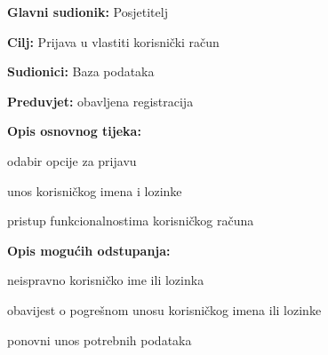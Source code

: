 					\noindent {}
					\begin{packed_item}
	
						\item \textbf{Glavni sudionik: }Posjetitelj
						\item  \textbf{Cilj:} Prijava u vlastiti korisnički račun
						\item  \textbf{Sudionici:} Baza podataka
						\item  \textbf{Preduvjet:} obavljena registracija
						\item  \textbf{Opis osnovnog tijeka:}
						
						\item[] \begin{packed_enum}
	
							\item odabir opcije za prijavu 
							\item unos korisničkog imena i lozinke
							\item pristup funkcionalnostima korisničkog računa
							
						\end{packed_enum}
						
						\item  \textbf{Opis mogućih odstupanja:}
						
						\item[] \begin{packed_item}
	
							\item[2.a] neispravno korisničko ime ili lozinka
							\item[] \begin{packed_enum}
								
								\item obavijest o pogrešnom unosu korisničkog imena ili lozinke
								\item ponovni unos potrebnih podataka
								
							\end{packed_enum}
							
						\end{packed_item}
					\end{packed_item}
					
